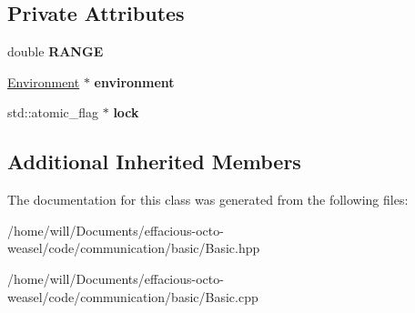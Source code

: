 \subsection*{Private Attributes}
\begin{DoxyCompactItemize}
\item 
double {\bfseries R\+A\+N\+GE}\hypertarget{class_basic_a1ae3bba4bffcccd85d2bec1e203dfc91}{}\label{class_basic_a1ae3bba4bffcccd85d2bec1e203dfc91}

\item 
\hyperlink{class_environment}{Environment} $\ast$ {\bfseries environment}\hypertarget{class_basic_a423ba62831d7042423051297cf2ed1f1}{}\label{class_basic_a423ba62831d7042423051297cf2ed1f1}

\item 
std\+::atomic\+\_\+flag $\ast$ {\bfseries lock}\hypertarget{class_basic_a99c0bdea02a9eabcadb14fa1733510fa}{}\label{class_basic_a99c0bdea02a9eabcadb14fa1733510fa}

\end{DoxyCompactItemize}
\subsection*{Additional Inherited Members}


The documentation for this class was generated from the following files\+:\begin{DoxyCompactItemize}
\item 
/home/will/\+Documents/effacious-\/octo-\/weasel/code/communication/basic/Basic.\+hpp\item 
/home/will/\+Documents/effacious-\/octo-\/weasel/code/communication/basic/Basic.\+cpp\end{DoxyCompactItemize}
